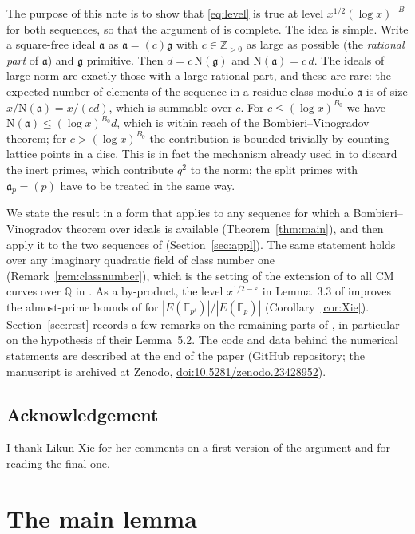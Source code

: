 \documentclass[11pt]{amsart}
\theoremstyle{remark}
\newcommand{\Z}{\mathbb{Z}}
\newcommand{\Q}{\mathbb{Q}}
\newcommand{\F}{\mathbb{F}}
\newcommand{\N}{\mathrm{N}}
\newcommand{\fa}{\mathfrak{a}}
\newcommand{\fg}{\mathfrak{g}}
\newcommand{\e}{\varepsilon}
\begin{document}
The purpose of this note is to show that \eqref{eq:level} is true at level $x^{1/2}(\log x)^{-B}$ for both sequences, so that the argument of \cite{IJU} is complete. The idea is simple. Write a square-free ideal $\fa$ as $\fa=(c)\fg$ with $c\in\Z_{>0}$ as large as possible (the \emph{rational part} of $\fa$) and $\fg$ primitive. Then $d=c\,\N(\fg)$ and $\N(\fa)=c\,d$. The ideals of large norm are exactly those with a large rational part, and these are rare: the expected number of elements of the sequence in a residue class modulo $\fa$ is of size $x/\N(\fa)=x/(cd)$, which is summable over $c$. For $c\le(\log x)^{B_0}$ we have $\N(\fa)\le (\log x)^{B_0} d$, which is within reach of the Bombieri--Vinogradov theorem; for $c>(\log x)^{B_0}$ the contribution is bounded trivially by counting lattice points in a disc. This is in fact the mechanism already used in \cite[p.~823]{IJU} to discard the inert primes, which contribute $q^2$ to the norm; the split primes with $\fa_p=(p)$ have to be treated in the same way.

We state the result in a form that applies to any sequence for which a Bombieri--Vinogradov theorem over ideals is available (Theorem~\ref{thm:main}), and then apply it to the two sequences of \cite{IJU} (Section~\ref{sec:appl}). The same statement holds over any imaginary quadratic field of class number one (Remark~\ref{rem:classnumber}), which is the setting of the extension of \cite{IJU} to all CM curves over $\Q$ in \cite{JU}. As a by-product, the level $x^{1/2-\e}$ in Lemma~3.3 of \cite{Xie} improves the almost-prime bounds of \cite[Theorem~1.3]{Xie} for $|E(\F_{p^\ell})|/|E(\F_p)|$ (Corollary~\ref{cor:Xie}). Section~\ref{sec:rest} records a few remarks on the remaining parts of \cite{IJU}, in particular on the hypothesis of their Lemma~5.2. The code and data behind the numerical statements are described at the end of the paper (GitHub repository; the manuscript is archived at Zenodo, \href{https://doi.org/10.5281/zenodo.23428952}{doi:10.5281/zenodo.23428952}).

\subsection*{Acknowledgement} I thank Likun Xie for her comments on a first version of the argument and for reading the final one.

\section{The main lemma}\label{sec:main}
\end{document}
